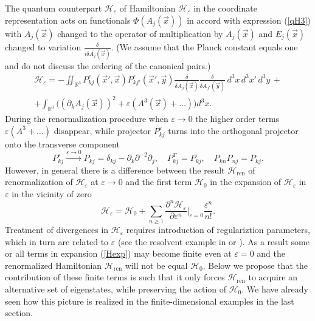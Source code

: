 \documentclass[12pt]{article}
\newcommand{\pl}{\partial}
\newcommand{\HH}{\mathscr{H}}
\newcommand{\Hcl}{\mathcal{H}}
\newcommand{\RR}{\mathbb{R}}
\newcommand{\ve}{\varepsilon}
\begin{document}
    The quantum counterpart
$ \HH_{\ve} $ of Hamiltonian
$ \Hcl_{\ve} $
    in the coordinate representation
    acts on functionals
$ \Phi(A_{j}(\vec{x})) $
    in accord with expression
(\ref{qH3})
    with
$ A_{j}(\vec{x}) $
    changed to the operator of multiplication by
$ A_{j}(\vec{x}) $
    and
$ E_{j}(\vec{x}) $
    changed to variation
$ \frac{\delta}{i\delta A_{j}(\vec{x})} $.
    (We assume that the Planck constant equals one and do not discuss
    the ordering of the canonical pairs.)
\begin{multline*}
    \HH_{\ve}
    = - \iint_{\RR^{3}}	P_{kj}^{\ve}(\vec{x}',\vec{x})
	P_{kj'}^{\ve}(\vec{x}',\vec{y})
    \frac{\delta}{\delta A_{j}(\vec{x})} \frac{\delta}{\delta A_{j'}(\vec{y})}
	    \, d^{3}x \, d^{3}x' \, d^{3}y \,+\\
	+ \int_{\RR^{3}}\bigl((\pl_{k} A_{j}(\vec{x}))^{2}
	+ \ve (A^{3}(\vec{x})+\ldots) \bigr) d^{3}x .
\end{multline*}
	During the renormalization procedure when
$ \ve \to 0 $
	the higher order terms
$ \ve (A^{3}+\ldots) $
	disappear, while projector
$ P_{kj}^{\ve} $
	turns into the orthogonal projector onto the transverse component
\begin{equation}
\label{Plim}
    P_{kj}^{\ve} \stackrel{\ve\to 0}{\rightarrow}
	P_{kj} = \delta_{kj} - \pl_{k} \pl^{-2} \pl_{j} ,\quad
    P_{kj}^{T} = P_{kj} ,\quad P_{kn} P_{nj} = P_{kj} .
\end{equation}
	However, in general there is a difference between the result
$ \HH_{\text{ren}} $
    of renormalization of
$ \HH_{\ve} $ at
$ \ve\to 0 $
    and the first term
$ \HH_{0} $ in the expansion of
$ \HH_{\ve} $
    in
$ \ve $
    in the vicinity of zero
\begin{equation}
\label{Hexp}
    \HH_{\ve} = \HH_{0} + \sum_{n\geq 1}
	\frac{\partial^{n} \HH_{\ve}}{\partial\ve^{n}}\bigr|_{\ve =0}
	\frac{\ve^{n}}{n!} .
\end{equation}
    Treatment of divergences in
$ \HH_{\ve} $
    requires introduction of regulariztion parameters,
    which in turn are related to
$ \ve $ (see the resolvent example in
\cite{LFBrazil} or \cite{LFres}).
    As a result some or all terms in expansion
(\ref{Hexp})
    may become finite even at
$ \ve = 0 $
    and the renormalized Hamiltonian
$ \HH_{\text{ren}} $
    will not be equal
$ \HH_{0} $.
    Below we propose that the contribution of these finite terms is such that
    it only forces
$ \HH_{\text{ren}} $
    to acquire an alternative set of eigenstates, while preserving the
    action of
$ \HH_{0} $.
    We have already seen how this picture is realized in the finite-dimensional
    examples in the last section.
\end{document}

